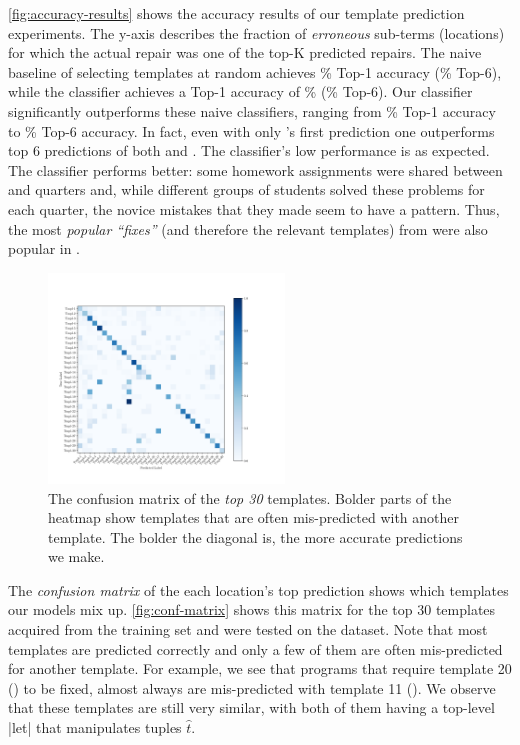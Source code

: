 %
\autoref{fig:accuracy-results} shows the accuracy results of our template
prediction experiments. The y-axis describes the fraction of \emph{erroneous}
sub-terms (locations) for which the actual repair was one of the top-K predicted
repairs.
%
The naive baseline of selecting templates at random achieves
\RandomTopOne\% Top-1 accuracy (\RandomTopSix\% Top-6), while
the \popular classifier achieves a Top-1 accuracy of \PopularTopOne\%
(\PopularTopSix\% Top-6).
%
Our \dnn classifier significantly outperforms these naive classifiers, ranging
from \DnnTopOne\% Top-1 accuracy to \DnnTopSix\% Top-6 accuracy.
%
In fact, even with only \dnn's first prediction one outperforms top 6
predictions of both \random and \popular.
%
The \random classifier's low performance is as expected.
%
The \popular classifier performs better: some homework assignments were shared
between \SPRING and \FALL quarters and, while different groups of students
solved these problems for each quarter, the novice mistakes that they made seem
to have a pattern. Thus, the most \emph{popular ``fixes''} (and therefore the
relevant templates) from \SPRING were also popular in \FALL.



\begin{figure}[t]
  \centering
  \includegraphics[trim={30 40 100 70},clip,height=2.2in]{evaluation-conf-matrix-no-title.pdf}
  \caption{The confusion matrix of the \emph{top 30} templates. Bolder parts of
  the heatmap show templates that are often mis-predicted with another template.
  The bolder the diagonal is, the more accurate predictions we make.}
  \label{fig:conf-matrix}
\end{figure}

%
The \emph{confusion matrix} of the each location's top prediction shows which
templates our models mix up.
%
\autoref{fig:conf-matrix} shows this matrix for the top 30 templates acquired
from the \SPRING training set and were tested on the \FALL dataset.
%
Note that most templates are predicted correctly and only a few of them are
often mis-predicted for another template.
%
For example, we see that programs that require template 20
() to be fixed,
almost always are mis-predicted with template 11 (). We observe that these templates are still very
similar, with both of them having a top-level |let| that manipulates tuples
$\hat{t}$.

